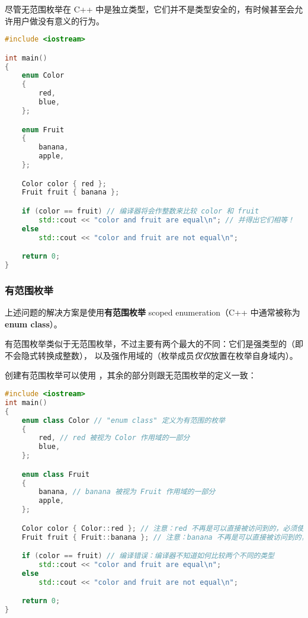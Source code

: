 \documentclass[../../LearnCpp.tex]{subfiles}
\begin{document}

尽管无范围枚举在 C++ 中是独立类型，它们并不是类型安全的，有时候甚至会允许用户做没有意义的行为。

\begin{lstlisting}[language=C++]
#include <iostream>

int main()
{
    enum Color
    {
        red,
        blue,
    };

    enum Fruit
    {
        banana,
        apple,
    };

    Color color { red };
    Fruit fruit { banana };

    if (color == fruit) // 编译器将会作整数来比较 color 和 fruit
        std::cout << "color and fruit are equal\n"; // 并得出它们相等！
    else
        std::cout << "color and fruit are not equal\n";

    return 0;
}
\end{lstlisting}

\subsubsection*{有范围枚举}

上述问题的解决方案是使用\textbf{有范围枚举} scoped enumeration（C++ 中通常被称为 \textbf{enum class}）。

有范围枚举类似于无范围枚举，不过主要有两个最大的不同：它们是强类型的（即不会隐式转换成整数），
以及强作用域的（枚举成员\textit{仅仅}放置在枚举自身域内）。

创建有范围枚举可以使用 ，其余的部分则跟无范围枚举的定义一致：

\begin{lstlisting}[language=C++]
#include <iostream>
int main()
{
    enum class Color // "enum class" 定义为有范围的枚举
    {
        red, // red 被视为 Color 作用域的一部分
        blue,
    };

    enum class Fruit
    {
        banana, // banana 被视为 Fruit 作用域的一部分
        apple,
    };

    Color color { Color::red }; // 注意：red 不再是可以直接被访问到的，必须使用 Color::red
    Fruit fruit { Fruit::banana }; // 注意：banana 不再是可以直接被访问到的，必须使用 Fruit::banana

    if (color == fruit) // 编译错误：编译器不知道如何比较两个不同的类型
        std::cout << "color and fruit are equal\n";
    else
        std::cout << "color and fruit are not equal\n";

    return 0;
}
\end{lstlisting}
\end{document}
